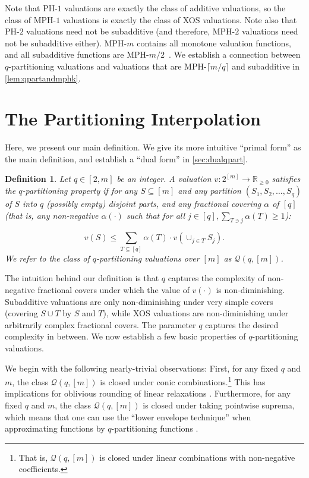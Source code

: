 \documentclass[11pt]{article}\usepackage{amsfonts}
\newtheorem{definition}[theorem]{Definition}
\numberwithin{theorem}{subsection}
\newcommand{\classqm}{\mathcal{Q}(q,[m])}
\begin{document}
Note that PH-$1$ valuations are exactly the class of additive valuations, so the class of MPH-$1$ valuations is exactly the class of XOS valuations. Note also that PH-$2$ valuations need not be subadditive (and therefore, MPH-$2$ valuations need not be subadditive either). MPH-$m$ contains all monotone valuation functions, and all subadditive functions are MPH-$m/2$~\cite{EzraFNTW19}. We establish a connection between $q$-partitioning valuations and valuations that are MPH-$\lceil m/q\rceil$ and subadditive in \cref{lem:qpartandmphk}.








\section{The Partitioning Interpolation}\label{sec:defineqpart}
Here, we present our main definition. We give its more intuitive ``primal form'' as the main definition, and establish a ``dual form'' in \cref{sec:dualqpart}.

\begin{definition}
\label{def:qpartprimal}
Let $q \in [2,m]$ be an integer. A valuation $v:2^{[m]}\longrightarrow \mathbb{R}_{\ge 0}$ satisfies the $q$-partitioning property if for any $S\subseteq [m]$ and any partition $(S_1, S_2, \ldots, S_q)$ of $S$ into $q$ (possibly empty) disjoint parts, and any fractional covering $\alpha$ of $[q]$ (that is, any non-negative $\alpha(\cdot)$ such that for all $j \in [q], \sum_{T \ni j} \alpha(T) \geq 1$):

$$v(S) \leq \sum_{T \subseteq [q]} \alpha(T) \cdot v\left(\cup_{j \in T} S_j\right).$$
We refer to the class of $q$-partitioning valuations over $[m]$ as $\mathcal{Q}(q,[m])$.

\end{definition}

The intuition behind our definition is that $q$ captures the complexity of non-negative fractional covers under which the value of $v(\cdot)$ is non-diminishing. Subadditive valuations are only non-diminishing under very simple covers (covering $S\cup T$ by $S$ and $T$), while XOS valuations are non-diminishing under arbitrarily complex fractional covers. The parameter $q$ captures the desired complexity in between. We now establish a few basic properties of $q$-partitioning valuations.

We begin with the following nearly-trivial observations: First, for any fixed $q$ and $m$, the class $\classqm$ is closed under conic combinations.\footnote{That is, $\classqm$ is closed under linear combinations with non-negative coefficients.} This has 
implications for oblivious rounding of linear relaxations \cite{FeigeFT16}. Furthermore, for any fixed $q$ and $m$, the class $\classqm$ is closed under taking pointwise suprema, which means that one can use the ``lower envelope technique'' when approximating functions by $q$-partitioning functions \cite[Section 3.1]{FeigeFIILS15}. 
\end{document}
